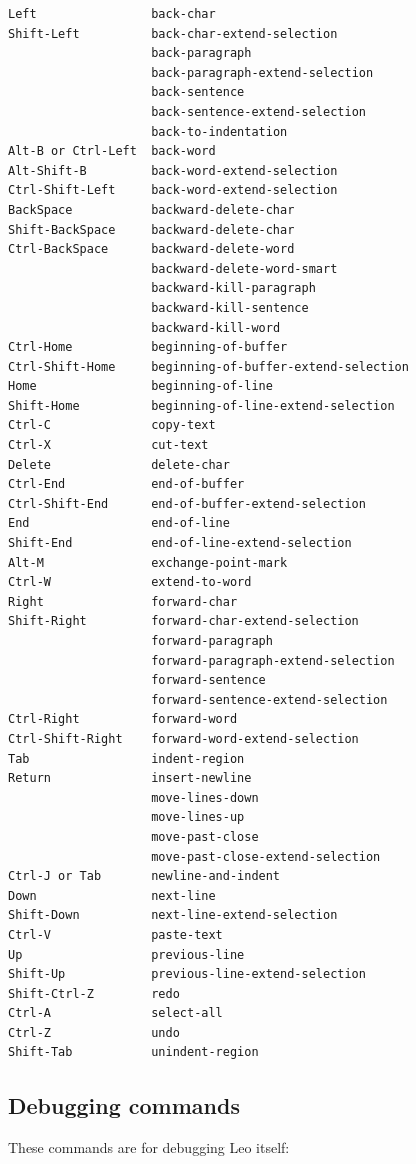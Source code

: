 \documentclass[a4paper,10pt,english]{sphinxmanual}
\begin{document}
\begin{Verbatim}[commandchars=\\\{\}]
Left                back-char
Shift-Left          back-char-extend-selection
                    back-paragraph
                    back-paragraph-extend-selection
                    back-sentence
                    back-sentence-extend-selection
                    back-to-indentation
Alt-B or Ctrl-Left  back-word
Alt-Shift-B         back-word-extend-selection
Ctrl-Shift-Left     back-word-extend-selection
BackSpace           backward-delete-char
Shift-BackSpace     backward-delete-char
Ctrl-BackSpace      backward-delete-word
                    backward-delete-word-smart
                    backward-kill-paragraph
                    backward-kill-sentence
                    backward-kill-word
Ctrl-Home           beginning-of-buffer
Ctrl-Shift-Home     beginning-of-buffer-extend-selection
Home                beginning-of-line
Shift-Home          beginning-of-line-extend-selection
Ctrl-C              copy-text
Ctrl-X              cut-text
Delete              delete-char
Ctrl-End            end-of-buffer
Ctrl-Shift-End      end-of-buffer-extend-selection
End                 end-of-line
Shift-End           end-of-line-extend-selection
Alt-M               exchange-point-mark
Ctrl-W              extend-to-word
Right               forward-char
Shift-Right         forward-char-extend-selection
                    forward-paragraph
                    forward-paragraph-extend-selection
                    forward-sentence
                    forward-sentence-extend-selection
Ctrl-Right          forward-word
Ctrl-Shift-Right    forward-word-extend-selection
Tab                 indent-region
Return              insert-newline
                    move-lines-down
                    move-lines-up
                    move-past-close
                    move-past-close-extend-selection
Ctrl-J or Tab       newline-and-indent
Down                next-line
Shift-Down          next-line-extend-selection
Ctrl-V              paste-text
Up                  previous-line
Shift-Up            previous-line-extend-selection
Shift-Ctrl-Z        redo
Ctrl-A              select-all
Ctrl-Z              undo
Shift-Tab           unindent-region
\end{Verbatim}


\subsection{Debugging commands}
\label{commands:debugging-commands}
These commands are for debugging Leo itself:
\end{document}
